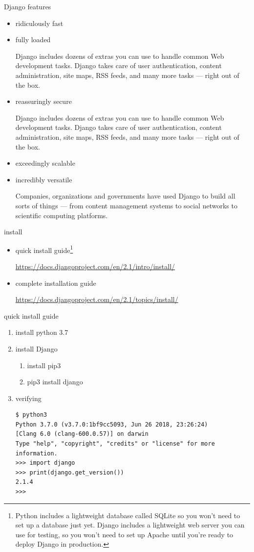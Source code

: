 \documentclass{beamer}
\begin{document}
\begin{frame}{Django features}
 \begin{itemize}
 \item ridiculously fast
 \item fully loaded
 
 Django includes dozens of extras you can use to handle common Web development tasks. Django takes care of user authentication, content administration, site maps, RSS feeds, and many more tasks — right out of the box.
 \item reassuringly secure
 
 Django includes dozens of extras you can use to handle common Web development tasks. Django takes care of user authentication, content administration, site maps, RSS feeds, and many more tasks — right out of the box.
 \item exceedingly scalable
 \item incredibly versatile
 
 Companies, organizations and governments have used Django to build all sorts of things — from content management systems to social networks to scientific computing platforms.
 \end{itemize}
\end{frame}
\begin{frame}{install}
\begin{itemize}
\item quick install guide\footnote{Python includes a lightweight database called SQLite so you won’t need to set up a database just yet. Django includes a lightweight web server you can use for testing, so you won’t need to set up Apache until you’re ready to deploy Django in production.}

\url{https://docs.djangoproject.com/en/2.1/intro/install/}
\item complete installation guide

\url{https://docs.djangoproject.com/en/2.1/topics/install/}
\end{itemize}
\end{frame}
\begin{frame}[fragile]{quick install guide}
\begin{enumerate}
\item install python 3.7
\item install Django
\begin{enumerate}
\item install pip3
\item pip3 install django
\end{enumerate}
\item verifying
\begin{verbatim}
$ python3
Python 3.7.0 (v3.7.0:1bf9cc5093, Jun 26 2018, 23:26:24) 
[Clang 6.0 (clang-600.0.57)] on darwin
Type "help", "copyright", "credits" or "license" for more information.
>>> import django
>>> print(django.get_version())
2.1.4
>>> 

\end{verbatim}
\end{enumerate}
\end{frame}
\end{document}
